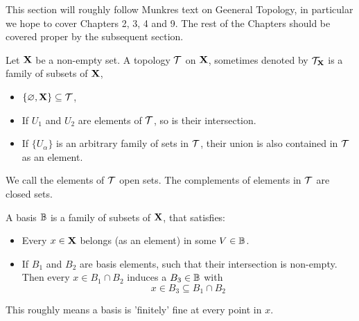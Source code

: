 \documentclass[../main-manifolds.tex]{subfiles}
\begin{document}
\providecommand{\szz}{\mathcal{S}}
\providecommand{\ccinf}{C_c^\infty}

\providecommand{\Taux}{\Tau_\xx}
\providecommand{\Tauy}{\Tau_\yy}
\providecommand{\Tauxy}{\Tau_{\xx\times\yy}}

\providecommand{\Bx}{\borel_\xx}
\providecommand{\By}{\borel_\yy}
\providecommand{\Bxy}{\borel_{\xx\times\yy}}


\newpage


This section will roughly follow Munkres text on Geeneral Topology, in particular we hope to cover Chapters 2, 3, 4 and 9. The rest of the Chapters should be covered proper by the subsequent section.


\begin{definition}[Topology]\label{chp4:topology-definition}
    Let ${\mathbf{X}}$ be a non-empty set. A topology $\mathcal{T}$ on ${\mathbf{X}}$, sometimes denoted by $\mathcal{T}_{\mathbf{X}}$ is a family of subsets of ${\mathbf{X}}$, 
\begin{itemize}
    \item $\{\varnothing,{\mathbf{X}}\}\subseteq \mathcal{T}$,
    \item If $U_1$ and $U_2$ are elements of $\mathcal{T}$, so is their intersection.
    \item If $\{U_\alpha\}$ is an arbitrary family of sets in $\mathcal{T}$, their union is also contained in $\mathcal{T}$ as an element.
\end{itemize}
We call the elements of $\mathcal{T}$ open sets. The complements of elements in $\mathcal{T}$ are closed sets.
\end{definition}

\newpage



\begin{definition}\label{chp4:basis-definition}
    A basis ${\mathbb{B}}$ is a family of subsets of ${\mathbf{X}}$, that satisfies:
    \begin{itemize}
        \item Every $x\in{\mathbf{X}}$ belongs (as an element) in some $V\in{\mathbb{B}}$.
        \item If $B_1$ and $B_2$ are basis elements, such that their intersection is non-empty. Then every $x\in B_1\cap B_2$ induces a $B_3\in{\mathbb{B}}$ with 
        \[
            x\in B_3\subseteq B_1\cap B_2
        \]
    \end{itemize}
    This roughly means a basis is 'finitely' fine at every point in $x$.
\end{definition}
\end{document}
